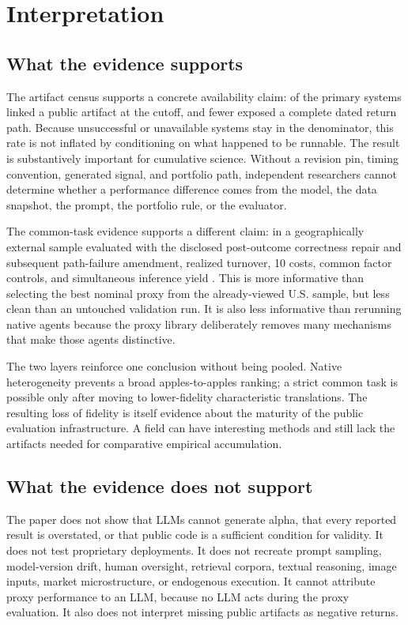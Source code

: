 \documentclass[11pt]{article}
\newcommand{\bps}[1]{\SI{#1}{\text{bp}}}
\begin{document}
\section{Interpretation}\label{sec:interpretation}

\subsection{What the evidence supports}

The artifact census supports a concrete availability claim: \ArtifactRateFT{} of the primary systems linked a public artifact at the cutoff, and fewer exposed a complete dated return path. Because unsuccessful or unavailable systems stay in the denominator, this rate is not inflated by conditioning on what happened to be runnable. The result is substantively important for cumulative science. Without a revision pin, timing convention, generated signal, and portfolio path, independent researchers cannot determine whether a performance difference comes from the model, the data snapshot, the prompt, the portfolio rule, or the evaluator.

The common-task evidence supports a different claim: in a geographically external sample evaluated with the disclosed post-outcome correctness repair and subsequent path-failure amendment, realized turnover, \bps{10} costs, common factor controls, and simultaneous inference yield \ResultInterpretation{}. This is more informative than selecting the best nominal proxy from the already-viewed U.S. sample, but less clean than an untouched validation run. It is also less informative than rerunning native agents because the proxy library deliberately removes many mechanisms that make those agents distinctive.

The two layers reinforce one conclusion without being pooled. Native heterogeneity prevents a broad apples-to-apples ranking; a strict common task is possible only after moving to lower-fidelity characteristic translations. The resulting loss of fidelity is itself evidence about the maturity of the public evaluation infrastructure. A field can have interesting methods and still lack the artifacts needed for comparative empirical accumulation.

\subsection{What the evidence does not support}

The paper does not show that LLMs cannot generate alpha, that every reported result is overstated, or that public code is a sufficient condition for validity. It does not test proprietary deployments. It does not recreate prompt sampling, model-version drift, human oversight, retrieval corpora, textual reasoning, image inputs, market microstructure, or endogenous execution. It cannot attribute proxy performance to an LLM, because no LLM acts during the proxy evaluation. It also does not interpret missing public artifacts as negative returns.
\end{document}
